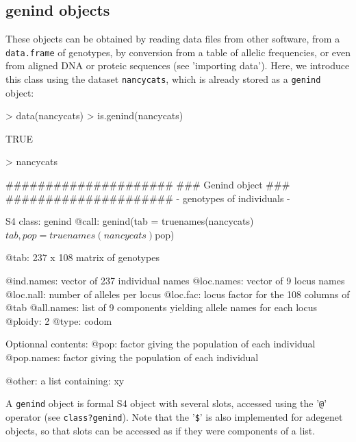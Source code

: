 \documentclass{article}
\begin{document}
\subsection{genind objects}
These objects can be obtained by reading data files from other software,
from a \texttt{data.frame} of genotypes, by conversion from a table of
allelic frequencies, or even from aligned DNA or proteic sequences (see 'importing data').
Here, we introduce this class using the dataset \texttt{nancycats}, which is already stored as a
\texttt{genind} object:
\begin{Schunk}
\begin{Sinput}
> data(nancycats)
> is.genind(nancycats)
\end{Sinput}
\begin{Soutput}
[1] TRUE
\end{Soutput}
\begin{Sinput}
> nancycats
\end{Sinput}
\begin{Soutput}
   #####################
   ### Genind object ### 
   #####################
- genotypes of individuals - 

S4 class:  genind
@call: genind(tab = truenames(nancycats)$tab, pop = truenames(nancycats)$pop)

@tab:  237 x 108 matrix of genotypes

@ind.names: vector of  237 individual names
@loc.names: vector of  9 locus names
@loc.nall: number of alleles per locus
@loc.fac: locus factor for the  108 columns of @tab
@all.names: list of  9 components yielding allele names for each locus
@ploidy:  2
@type:  codom

Optionnal contents: 
@pop:  factor giving the population of each individual
@pop.names:  factor giving the population of each individual

@other: a list containing: xy 
\end{Soutput}
\end{Schunk}
A \texttt{genind} object is formal S4 object with several slots,
accessed using the '\texttt{@}' operator (see \texttt{class?genind}).
Note that the '\texttt{\$}' is also implemented for adegenet objects,
so that slots can be accessed as if they were components of a list.
\\
\end{document}
